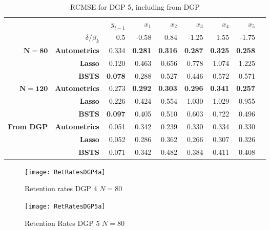 \begin{table}[htbp]
  \centering

    \begin{tabular}{r|r|rrrrrrr}

          &       & $y_{t-1}$ & $x_{1}$ & $x_{2}$ & $x_{3}$ & $x_{4}$ & $x_{5}$ &  \\

         & $\delta/\beta_{k}$ &   0.5 & -0.58 &0.84 &-1.25 &  1.55 & -1.75  \\
         \hline
    $\bm{N=80} $& \textbf{Autometrics} & 0.334 & \textbf{0.281} & \textbf{0.316} & \textbf{0.287} & \textbf{0.325} & \textbf{0.258} &  \\
    \textbf{} & \textbf{Lasso} & 0.120 & 0.463 & 0.656 & 0.778 & 1.074 & 1.225 &  \\
    \textbf{} & \textbf{BSTS} & \textbf{0.078} & 0.288 & 0.527 & 0.446 & 0.572 & 0.571 &  \\
    \hline
    $\bm{N=120}$ & \textbf{Autometrics} & 0.273 & \textbf{0.292} & \textbf{0.303} & \textbf{0.296} & \textbf{0.341} & \textbf{0.257} &  \\
    \textbf{} & \textbf{Lasso} & 0.226 & 0.424 & 0.554 & 1.030 & 1.029 & 0.955 &  \\
    \textbf{} & \textbf{BSTS} & \textbf{0.097} & 0.405 & 0.510 & 0.603 & 0.722 & 0.496 &  \\
    \hline
    \textbf{From DGP} & \textbf{Autometrics} & 0.051 & 0.342 & 0.239 & 0.330 & 0.334 & 0.330 &  \\
          & \textbf{Lasso} & 0.052 & 0.286 & 0.362 & 0.266 & 0.307 & 0.326 &  \\
          & \textbf{BSTS} & 0.071 & 0.342 & 0.482 & 0.384 & 0.411 & 0.408 &  \\

    \end{tabular}%
      \caption{RCMSE for DGP 5, including from DGP}
  \label{LDGP5CMSE}%
\end{table}%






\begin{figure}

\begin{minipage}{.5\textwidth}
\centering
\texttt{[image: RetRatesDGP4a]}
\caption{Retention rates DGP 4 \newline $N=80$}
\label{fig:RetRatesDGP4a}
\end{minipage}%
\begin{minipage}{.5\textwidth}
\centering
\texttt{[image: RetRatesDGP5a]}
\caption{Retention Rates DGP 5 \newline $N=80$}
\label{fig:RetRatesDGP5a}

\end{minipage}

\end{figure}

